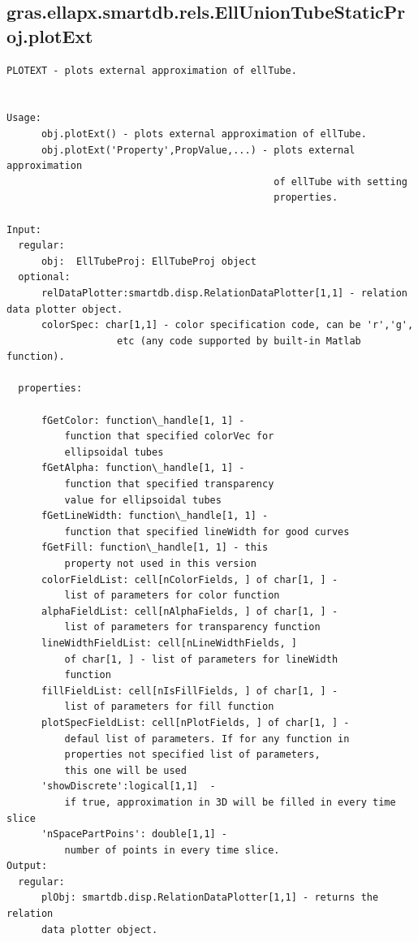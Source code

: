 \documentclass[letterpaper,10pt,english]{sphinxmanual}
\begin{document}
\subsection{gras.ellapx.smartdb.rels.EllUnionTubeStaticProj.plotExt}
\label{chap_functions:gras-ellapx-smartdb-rels-elluniontubestaticproj-plotext}
\begin{Verbatim}[commandchars=\\\{\}]
PLOTEXT - plots external approximation of ellTube.


Usage:
      obj.plotExt() - plots external approximation of ellTube.
      obj.plotExt('Property',PropValue,...) - plots external approximation
                                              of ellTube with setting
                                              properties.

Input:
  regular:
      obj:  EllTubeProj: EllTubeProj object
  optional:
      relDataPlotter:smartdb.disp.RelationDataPlotter[1,1] - relation data plotter object.
      colorSpec: char[1,1] - color specification code, can be 'r','g',
                   etc (any code supported by built-in Matlab function).

  properties:

      fGetColor: function\_handle[1, 1] -
          function that specified colorVec for
          ellipsoidal tubes
      fGetAlpha: function\_handle[1, 1] -
          function that specified transparency
          value for ellipsoidal tubes
      fGetLineWidth: function\_handle[1, 1] -
          function that specified lineWidth for good curves
      fGetFill: function\_handle[1, 1] - this
          property not used in this version
      colorFieldList: cell[nColorFields, ] of char[1, ] -
          list of parameters for color function
      alphaFieldList: cell[nAlphaFields, ] of char[1, ] -
          list of parameters for transparency function
      lineWidthFieldList: cell[nLineWidthFields, ]
          of char[1, ] - list of parameters for lineWidth
          function
      fillFieldList: cell[nIsFillFields, ] of char[1, ] -
          list of parameters for fill function
      plotSpecFieldList: cell[nPlotFields, ] of char[1, ] -
          defaul list of parameters. If for any function in
          properties not specified list of parameters,
          this one will be used
      'showDiscrete':logical[1,1]  -
          if true, approximation in 3D will be filled in every time slice
      'nSpacePartPoins': double[1,1] -
          number of points in every time slice.
Output:
  regular:
      plObj: smartdb.disp.RelationDataPlotter[1,1] - returns the relation
      data plotter object.
\end{Verbatim}
\end{document}

